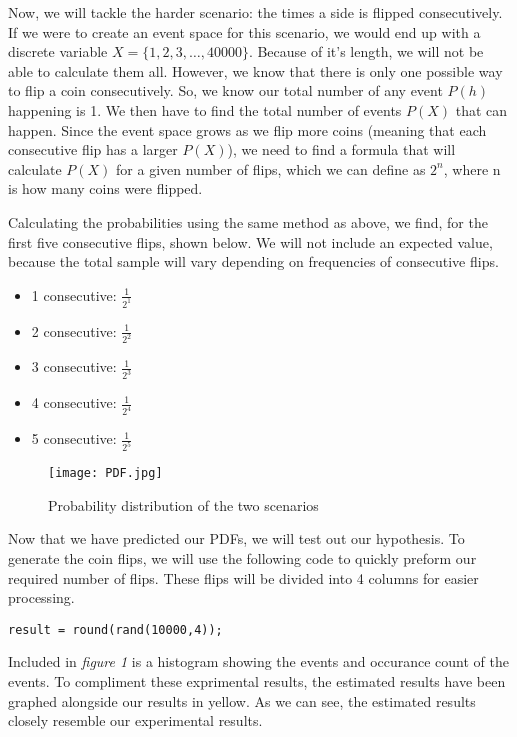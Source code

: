 \documentclass{report}
\begin{document}
\pagebreak
Now, we will tackle the harder scenario: the times a side is flipped consecutively. If we were to create an event space for this scenario, we would end up with a discrete variable $X = \{1, 2, 3, \dots, 40000\}$. Because of it's length, we will not be able to calculate them all. However, we know that there is only one possible way to flip a coin consecutively. So, we know our total number of any event $P(h)$ happening is 1. We then have to find the total number of events $P(X)$ that can happen. Since the event space grows as we flip more coins (meaning that each consecutive flip has a larger $P(X)$), we need to find a formula that will calculate $P(X)$ for a given number of flips, which we can define as $2^n$, where n is how many coins were flipped.

Calculating the probabilities using the same method as above, we find, for the first five consecutive flips, shown below. We will not include an expected value, because the total sample will vary depending on frequencies of consecutive flips.

\begin{itemize}
\item{1 consecutive: $\frac{1}{2^1}$}
\item{2 consecutive: $\frac{1}{2^2}$}
\item{3 consecutive: $\frac{1}{2^3}$}
\item{4 consecutive: $\frac{1}{2^4}$}
\item{5 consecutive: $\frac{1}{2^5}$}
\end{itemize}


\newpage
\begin{figure}
    \centering
    \texttt{[image: PDF.jpg]}
    \caption{Probability distribution of the two scenarios}
\end{figure} 

Now that we have predicted our PDFs, we will test out our hypothesis. To generate the coin flips, we will use the following code to quickly preform our required number of flips. These flips will be divided into 4 columns for easier processing.

\begin{lstlisting}
result = round(rand(10000,4));
\end{lstlisting}

Included in \textit{figure 1} is a histogram showing the events and occurance count of the events. To compliment these exprimental results, the estimated results have been graphed alongside our results in yellow. As we can see, the estimated results closely resemble our experimental results.
\end{document}
